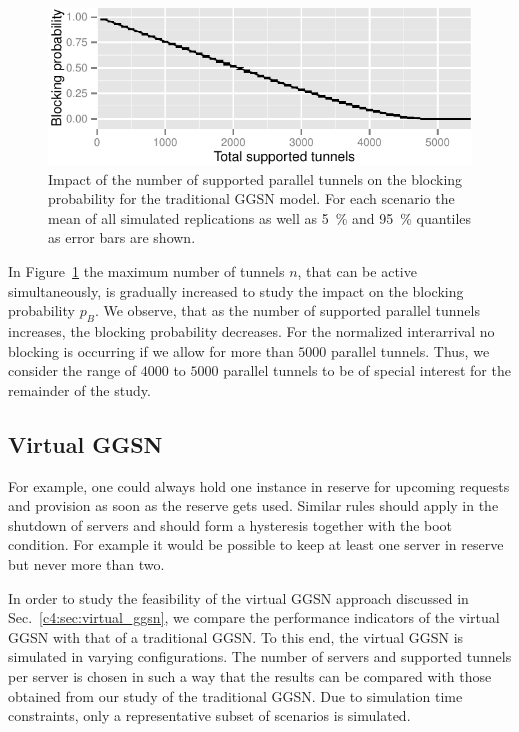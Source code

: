 \begin{figure}[htp]
  \centering
    \includegraphics[width=1.0\textwidth]{images/traditional-blocking.pdf}
  \caption{Impact of the number of supported parallel tunnels on the blocking probability for the traditional \gls{GGSN} model. For each scenario the mean of all simulated replications as well as \SI{5}{\percent} and \SI{95}{\percent} quantiles as error bars are shown.}
  \label{c4:fig:traditional_blocking}
\end{figure}

In Figure~\ref{c4:fig:traditional_blocking} the maximum number of tunnels $n$, that can be active simultaneously, is gradually increased to study the impact on the blocking probability $p_B$. We observe, that as the number of supported parallel tunnels increases, the blocking probability decreases. For the normalized interarrival no blocking is occurring if we allow for more than $5000$ parallel tunnels. Thus, we consider the range of $4000$ to $5000$ parallel tunnels to be of special interest for the remainder of the study.


\subsection{Virtual \texorpdfstring{\acrshort{GGSN}}{GGSN}}
\label{c4:sec:eval_ideal_virtual_ggsn}

For example, one could always hold one instance in reserve for upcoming requests and provision as soon as the reserve gets used. Similar rules should apply in the shutdown of servers and should form a hysteresis together with the boot condition. 
For example it would be possible to keep at least one server in reserve but never more than two.

In order to study the feasibility of the virtual \gls{GGSN} approach discussed in Sec.~\ref{c4:sec:virtual_ggsn}, we compare the performance indicators of the virtual \gls{GGSN} with that of a traditional \gls{GGSN}. To this end, the virtual \gls{GGSN} is simulated in varying configurations.
The number of servers and supported tunnels per server is chosen in such a way that the results can be compared with those obtained from our study of the traditional \gls{GGSN}. Due to simulation time constraints, only a representative subset of scenarios is simulated.

